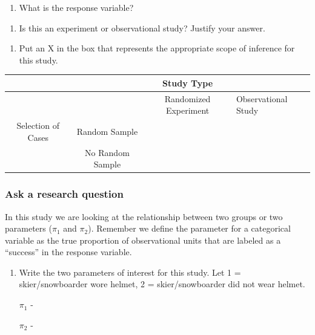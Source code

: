 \documentclass[
]{report}
\providecommand{\tightlist}{%
  \setlength{\itemsep}{0pt}\setlength{\parskip}{0pt}}
\begin{document}
\vspace{0.3in}

\begin{enumerate}
\def\labelenumi{\arabic{enumi}.}
\setcounter{enumi}{1}
\tightlist
\item
  What is the response variable?
\end{enumerate}

\vspace{0.3in}

\begin{enumerate}
\def\labelenumi{\arabic{enumi}.}
\setcounter{enumi}{2}
\tightlist
\item
  Is this an experiment or observational study? Justify your answer.
\end{enumerate}

\newpage

\begin{enumerate}
\def\labelenumi{\arabic{enumi}.}
\setcounter{enumi}{3}
\tightlist
\item
  Put an X in the box that represents the appropriate scope of inference for this study.
\end{enumerate}

\begin{longtable}[]{@{}cccl@{}}
\toprule
& & Study Type &\tabularnewline
\midrule
\endhead
& & Randomized Experiment & Observational Study\tabularnewline
Selection of Cases & Random Sample & &\tabularnewline
& No Random Sample & &\tabularnewline
\bottomrule
\end{longtable}

\hypertarget{ask-a-research-question-1}{%
\subsubsection*{Ask a research question}\label{ask-a-research-question-1}}

In this study we are looking at the relationship between two groups or two parameters (\(\pi_1\) and \(\pi_2\)). Remember we define the parameter for a categorical variable as the true proportion of observational units that are labeled as a ``success'' in the response variable.

\begin{enumerate}
\def\labelenumi{\arabic{enumi}.}
\setcounter{enumi}{4}
\item
  Write the two parameters of interest for this study. Let 1 = skier/snowboarder wore helmet, 2 = skier/snowboarder did not wear helmet.
  \vspace{1mm}

  \(\pi_1\) -
  \vspace{0.5in}

  \(\pi_2\) -
  \vspace{0.5in}
\end{enumerate}
\end{document}
